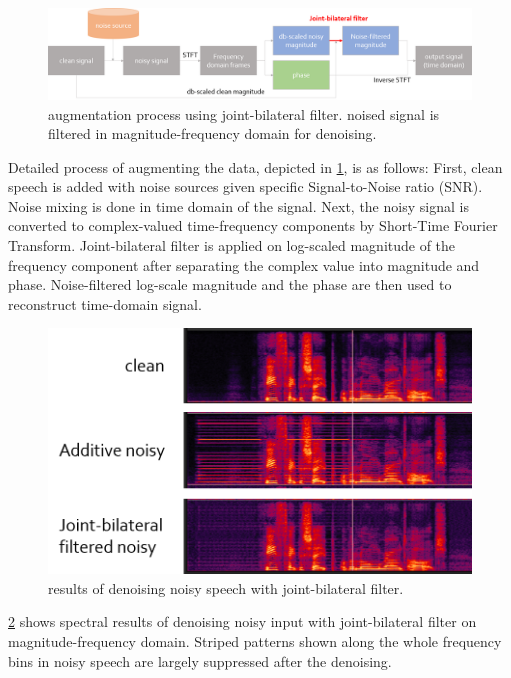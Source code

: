 \documentclass[10pt,twocolumn,letterpaper]{article}
\begin{document}
\begin{figure}[h]
   \centering
   \includegraphics[width=\linewidth]{jbfilter_process}
   \caption{augmentation process using joint-bilateral filter. noised signal is filtered in 
   magnitude-frequency domain for denoising.}
   \label{fig:jbfilter_process}
\end{figure}

Detailed process of augmenting the data, depicted in \cref{fig:jbfilter_process}, is as follows: 
First, clean speech is added with noise sources given specific Signal-to-Noise ratio (SNR).
Noise mixing is done in time domain of the signal. Next, the noisy signal is converted to complex-valued
time-frequency components by Short-Time Fourier Transform. Joint-bilateral filter is applied on log-scaled
magnitude of the frequency component after separating the complex value into magnitude and phase.
Noise-filtered log-scale magnitude and the phase are then used to reconstruct time-domain signal. 

\begin{figure}[h]
   \centering
   \includegraphics[width=0.9\linewidth]{jbfilter_result_v2}
   \caption{results of denoising noisy speech with joint-bilateral filter.}
   \label{fig:jbfilter_result}
\end{figure}

\cref{fig:jbfilter_result} shows spectral results of denoising noisy input with joint-bilateral filter on 
magnitude-frequency domain. Striped patterns shown along the whole frequency bins in noisy speech are 
largely suppressed after the denoising. 
\end{document}

